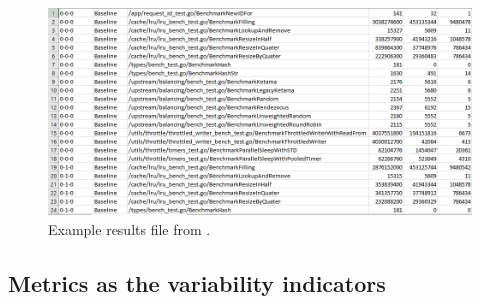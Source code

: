 \documentclass{seal_thesis}
\begin{document}
\begin{figure}[H]
	\centering
	\includegraphics[width=\linewidth]{exampleresults}
	\caption{Example results file from \cite{ironsmile/nedomi}.}
	\label{fig:exampleresults}
\end{figure}
 
\subsection{Metrics as the variability indicators}
\end{document}
